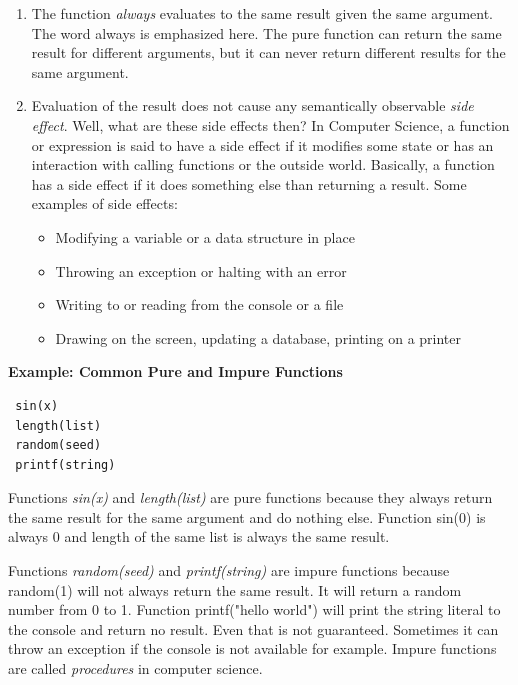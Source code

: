 \documentclass[12pt,twoside,a4paper]{report}
\begin{document}
\begin{enumerate}\itemsep1pt \parskip0pt 
\item The function \emph{always} evaluates to the same result given the same argument. The word always is emphasized here. The pure function can return the same result for different arguments, but it can never return different results for the same argument.
\item Evaluation of the result does not cause any semantically observable \emph{side effect}. Well, what are these side effects then? In Computer Science, a function or expression is said to have a side effect if it modifies some state or has an interaction with calling functions or the outside world. Basically, a function has a side effect if it does something else than returning a result. Some examples of side effects:

\begin{itemize}\itemsep1pt \parskip0pt 
\item Modifying a variable or a data structure in place
\item Throwing an exception or halting with an error
\item Writing to or reading from the console or a file
\item Drawing on the screen, updating a database, printing on a printer
\end{itemize}
\end{enumerate}

\textbf{Example: Common Pure and Impure Functions}

\begin{lstlisting}
 sin(x)
 length(list)
 random(seed)
 printf(string)
\end{lstlisting}

Functions \emph{sin(x)} and \emph{length(list)} are pure functions because they always return the same result for the same argument and do nothing else. Function sin(0) is always 0 and length of the same list is always the same result.\par
Functions \emph{random(seed)} and \emph{printf(string)} are impure functions because random(1) will not always return the same result. It will return a random number from 0 to 1. Function printf("hello world") will print the string literal to the console and return no result. Even that is not guaranteed. Sometimes it can throw an exception if the console is not available for example. Impure functions are called \emph{procedures} in computer science.
\end{document}
